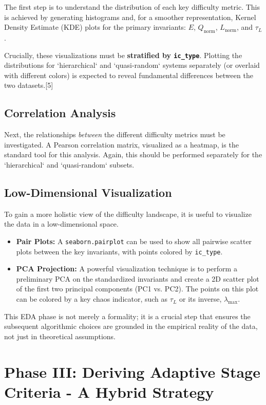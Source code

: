 \documentclass[11pt, letterpaper]{article}
\begin{document}
The first step is to understand the distribution of each key difficulty metric. This is achieved by generating histograms and, for a smoother representation, Kernel Density Estimate (KDE) plots for the primary invariants: $E$, $Q_{\text{norm}}$, $L_{\text{norm}}$, and $\tau_L$.

Crucially, these visualizations must be \textbf{stratified by \texttt{ic\_type}}. Plotting the distributions for `hierarchical` and `quasi-random` systems separately (or overlaid with different colors) is expected to reveal fundamental differences between the two datasets.[5]

\subsection{Correlation Analysis}

Next, the relationships \textit{between} the different difficulty metrics must be investigated. A Pearson correlation matrix, visualized as a heatmap, is the standard tool for this analysis. Again, this should be performed separately for the `hierarchical` and `quasi-random` subsets.

\subsection{Low-Dimensional Visualization}

To gain a more holistic view of the difficulty landscape, it is useful to visualize the data in a low-dimensional space.
\begin{itemize}
    \item \textbf{Pair Plots:} A \texttt{seaborn.pairplot} can be used to show all pairwise scatter plots between the key invariants, with points colored by \texttt{ic\_type}.
    \item \textbf{PCA Projection:} A powerful visualization technique is to perform a preliminary PCA on the standardized invariants and create a 2D scatter plot of the first two principal components (PC1 vs. PC2). The points on this plot can be colored by a key chaos indicator, such as $\tau_L$ or its inverse, $\lambda_{\text{max}}$.
\end{itemize}
This EDA phase is not merely a formality; it is a crucial step that ensures the subsequent algorithmic choices are grounded in the empirical reality of the data, not just in theoretical assumptions.

\section{Phase III: Deriving Adaptive Stage Criteria - A Hybrid Strategy}
\end{document}
